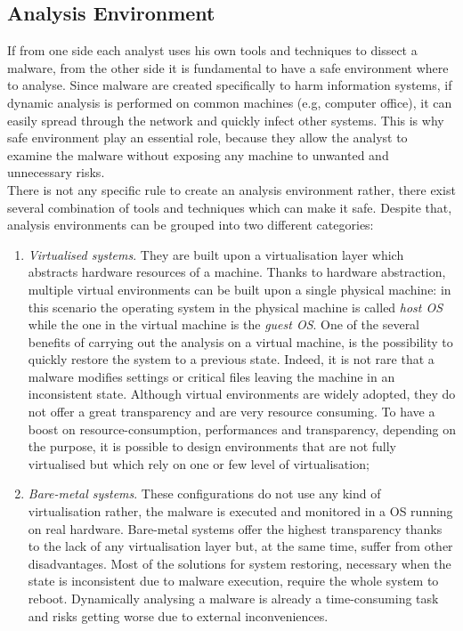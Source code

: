 \documentclass[LaM,binding=0.6cm]{sapthesis}
\begin{document}
\subsection{Analysis Environment}
\label{subsec:analysisenvironment}
If from one side each analyst uses his own tools and techniques to dissect a malware, from the other side it is fundamental to have a safe environment where to analyse. Since malware are created specifically to harm information systems, if dynamic analysis is performed on common machines (e.g, computer office), it can easily spread through the network and quickly infect other systems. This is why safe environment play an essential role, because they allow the analyst to examine the malware without exposing any machine to unwanted and unnecessary risks.\\
There is not any specific rule to create an analysis environment rather, there exist several combination of tools and techniques which can make it safe. Despite that, analysis environments can be grouped into two different categories:
\begin{enumerate}
\item \textit{Virtualised systems}. They are built upon a virtualisation layer which abstracts hardware resources of a machine. Thanks to hardware abstraction, multiple virtual environments can be built upon a single physical machine: in this scenario the operating system in the physical machine is called \textit{host OS} while the one in the virtual machine is the \textit{guest OS}. One of the several benefits of carrying out the analysis on a virtual machine, is the possibility to quickly restore the system to a previous state. Indeed, it is not rare that a malware modifies settings or critical files leaving the machine in an inconsistent state. Although virtual environments are widely adopted, they do not offer a great transparency and are very resource consuming. To have a boost on resource-consumption, performances and transparency, depending on the purpose, it is possible to design environments that are not fully virtualised but which rely on one or few level of virtualisation;
\item \textit{Bare-metal systems}. These configurations do not use any kind of virtualisation rather, the malware is executed and monitored in a OS running on real hardware\cite{kirat2011barebox}. Bare-metal systems offer the highest transparency thanks to the lack of any virtualisation layer but, at the same time, suffer from other disadvantages. Most of the solutions for system restoring, necessary when the state is inconsistent due to malware execution, require the whole system to reboot. Dynamically analysing a malware is already a time-consuming task and risks getting worse due to external inconveniences.
\end{enumerate}
\end{document}
